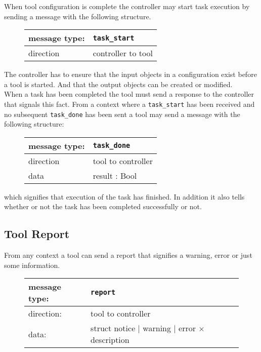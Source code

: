 \documentclass{article}
\newcommand{\msg}[1]{\texttt{#1}}
\begin{document}
   \noindent When tool configuration is complete the controller may start task
   execution by sending a message with the following structure.

   \begin{figure}[H]
    \begin{tabular}{|ll|}
     \hline
      message type:   & \msg{task\_start} \\
     \hline
      direction       & controller to tool \\
     \hline
    \end{tabular}
   \end{figure}

   \noindent The controller has to ensure that the input objects in a
   configuration exist before a tool is started. And that the output objects
   can be created or modified.
   \\[4pt]
   When a task has been completed the tool must send a response to the
   controller that signals this fact. From a context where a \msg{task\_start}
   has been received and no subsequent \msg{task\_done} has been sent a tool
   may send a message with the following structure:

   \begin{figure}[H]
    \begin{tabular}{|ll|}
     \hline
      message type:   & \msg{task\_done} \\
     \hline
      direction       & tool to controller \\
      data            & result : Bool \\
     \hline
    \end{tabular}
   \end{figure}

   \noindent which signifies that execution of the task has finished. In addition it also
   tells whether or not the task has been completed successfully or not.

  \subsection{Tool Report}

   From any context a tool can send a report that signifies a warning, error or
   just some information.

   \begin{figure}[H]
    \begin{tabular}{|ll|}
     \hline
      message type:   & \msg{report} \\
     \hline
      direction:      & tool to controller \\
      data:           & struct notice $|$ warning $|$ error $\times$ description \\
     \hline
    \end{tabular}
   \end{figure}
\end{document}
